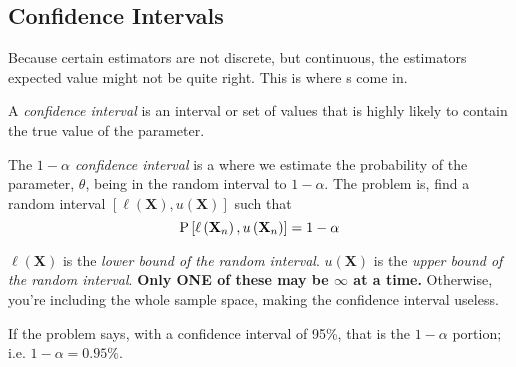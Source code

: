	\subsection{Confidence Intervals} \label{subsec:Confidence Interval}
	Because certain estimators are not discrete, but continuous, the estimators expected value might not be quite right.
	This is where s come in.
		\begin{definition} \label{def:Confidence Interval}
			A \emph{confidence interval} is an interval or set of values that is highly likely to contain the true value of the parameter.
		\end{definition}
		\begin{definition} \label{def:1-alpha Confidence Interval}
			The \emph{$1-\alpha$ confidence interval} is a  where we estimate the probability of the parameter, $\theta$, being in the random interval to $1-\alpha$.
			The problem is, find a random interval $\left[ \ell \left( \mathbf{X} \right), u \left( \mathbf{X} \right) \right]$ such that
			\begin{equation} \label{eq:1-alpha Confidence Interval}
				\operatorname{\operatorname{P}} \left[ \ell \left( \mathbf{X}_{n} \right) , u \left( \mathbf{X}_{n} \right) \right] = 1-\alpha
			\end{equation}
			\begin{remark}
				$\ell \left( \mathbf{X} \right)$ is the \emph{lower bound of the random interval}.
				$u \left( \mathbf{X} \right)$ is the \emph{upper bound of the random interval}.
				\textbf{Only ONE of these may be $\infty$ at a time.} Otherwise, you're including the whole sample space, making the confidence interval useless.
			\end{remark}
			\begin{remark}
				If the problem says, with a confidence interval of 95\%, that is the $1-\alpha$ portion; i.e. $1-\alpha = 0.95 \%$.
			\end{remark}
		\end{definition}
	
